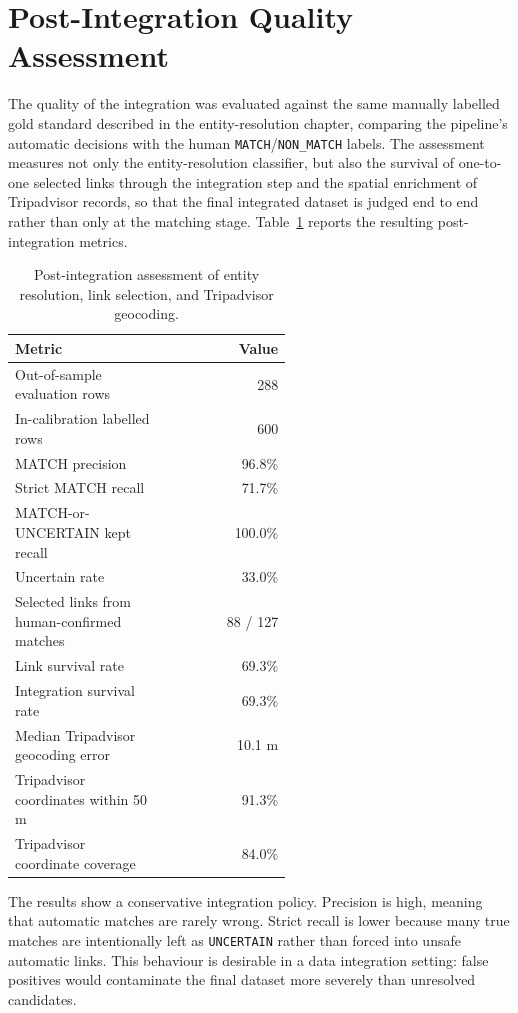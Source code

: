 \section{Post-Integration Quality Assessment}
\label{sec:post-integration-quality}

The quality of the integration was evaluated against the same manually labelled
gold standard described in the entity-resolution chapter, comparing the pipeline's
automatic decisions with the human \texttt{MATCH}/\texttt{NON\_MATCH} labels. The
assessment measures not only the entity-resolution classifier, but also the
survival of one-to-one selected links through the integration step and the spatial
enrichment of Tripadvisor records, so that the final integrated dataset is judged
end to end rather than only at the matching stage. Table~\ref{tab:post-integration-quality}
reports the resulting post-integration metrics.

\begin{table}[t]
\centering
\footnotesize
\begin{tabular}{p{0.55\linewidth}r}
\toprule
\textbf{Metric} & \textbf{Value} \\
\midrule
Out-of-sample evaluation rows & 288 \\
In-calibration labelled rows & 600 \\
MATCH precision & 96.8\% \\
Strict MATCH recall & 71.7\% \\
MATCH-or-UNCERTAIN kept recall & 100.0\% \\
Uncertain rate & 33.0\% \\
Selected links from human-confirmed matches & 88 / 127 \\
Link survival rate & 69.3\% \\
Integration survival rate & 69.3\% \\
Median Tripadvisor geocoding error & 10.1 m \\
Tripadvisor coordinates within 50 m & 91.3\% \\
Tripadvisor coordinate coverage & 84.0\% \\
\bottomrule
\end{tabular}
\caption{Post-integration assessment of entity resolution, link selection, and Tripadvisor geocoding.}
\label{tab:post-integration-quality}
\end{table}

The results show a conservative integration policy. Precision is high, meaning
that automatic matches are rarely wrong. Strict recall is lower because many
true matches are intentionally left as \texttt{UNCERTAIN} rather than forced into
unsafe automatic links. This behaviour is desirable in a data integration
setting: false positives would contaminate the final dataset more severely than
unresolved candidates.

